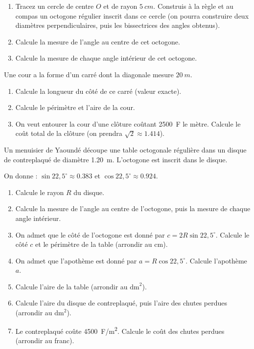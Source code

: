 \documentclass[11pt]{article}
\newcounter{popsec}
\newcounter{popsub}
\newcommand{\courssub}[1]{%
  \stepcounter{popsub}%
  \par\vspace{9pt}\noindent{\popxbold\fontsize{11.5}{13}\selectfont\color{popink}{\color{poporange}\thepopsec.\thepopsub}\hspace{6pt}#1}\par\nopagebreak\vspace{4pt}
}
\begin{document}
\begin{exercice}
\begin{enumerate}
\item Tracez un cercle de centre $O$ et de rayon $\SI{5}{cm}$. Construis à la règle et au compas un octogone régulier inscrit dans ce cercle (on pourra construire deux diamètres perpendiculaires, puis les bissectrices des angles obtenus).
\item Calcule la mesure de l'angle au centre de cet octogone.
\item Calcule la mesure de chaque angle intérieur de cet octogone.
\end{enumerate}
\end{exercice}

\begin{exercice}
Une cour a la forme d'un carré dont la diagonale mesure $\SI{20}{m}$.
\begin{enumerate}
\item Calcule la longueur du côté de ce carré (valeur exacte).
\item Calcule le périmètre et l'aire de la cour.
\item On veut entourer la cour d'une clôture coûtant \SI{2500}{F} le mètre. Calcule le coût total de la clôture (on prendra $\sqrt{2} \approx \num{1,414}$).
\end{enumerate}
\end{exercice}

\courssub{Je me prépare au Probatoire}

\begin{exercice}
Un menuisier de Yaoundé découpe une table octogonale régulière dans un disque de contreplaqué de diamètre \SI{1,20}{m}. L'octogone est inscrit dans le disque.

On donne : $\sin 22,5^{\circ} \approx \num{0,383}$ et $\cos 22,5^{\circ} \approx \num{0,924}$.
\begin{enumerate}
\item Calcule le rayon $R$ du disque.
\item Calcule la mesure de l'angle au centre de l'octogone, puis la mesure de chaque angle intérieur.
\item On admet que le côté de l'octogone est donné par $c = 2R\sin 22,5^{\circ}$. Calcule le côté $c$ et le périmètre de la table (arrondir au $\text{cm}$).
\item On admet que l'apothème est donné par $a = R\cos 22,5^{\circ}$. Calcule l'apothème $a$.
\item Calcule l'aire de la table (arrondir au $\text{dm}^2$).
\item Calcule l'aire du disque de contreplaqué, puis l'aire des chutes perdues (arrondir au $\text{dm}^2$).
\item Le contreplaqué coûte \SI{4500}{F/m^2}. Calcule le coût des chutes perdues (arrondir au franc).
\end{enumerate}
\end{exercice}
\end{document}

